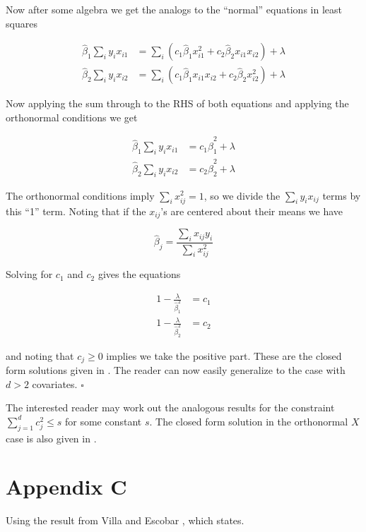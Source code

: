Now after some algebra we get the analogs to the ``normal'' equations in least squares

\begin{align}
  \hat{\beta}_1\sum_iy_ix_{i1}&=\sum_i(c_1\hat{\beta}_1x_{i1}^2+c_2\hat{\beta}_2x_{i1}x_{i2}) +\lambda\\
 \hat{\beta}_2\sum_iy_ix_{i2}&=\sum_i(c_1\hat{\beta}_1x_{i1}x_{i2}+c_2\hat{\beta}_2x^2_{i2})+\lambda 
\end{align}

Now applying the sum through to the RHS of both equations and applying the orthonormal conditions we get

\begin{align}
  \hat{\beta}_1\sum_iy_ix_{i1}&=c_1\hat{\beta}_1^2+\lambda \\
 \hat{\beta}_2\sum_iy_ix_{i2}&=c_2\hat{\beta}_2^2 +\lambda
\end{align}

The orthonormal conditions imply $\sum_ix_{ij}^2=1$, so we divide the $\sum_i y_i x_{ij}$ terms by this ``1'' term. Noting that if the $x_{ij}$'s are centered about their means we have

\begin{equation}
\hat{\beta}_j = \frac{\sum_i x_{ij} y_i}{\sum_ix_{ij}^2} 
\end{equation}

Solving for $c_1$ and $c_2$ gives the equations 

\begin{align}
 1- \frac{\lambda}{\hat{\beta}_1^2}&=c_1 \\
  1-\frac{\lambda}{\hat{\beta}_2^2}&=c_2 
\end{align}

and noting that $c_j \geq 0$ implies we take the positive part.  These are the closed form solutions given in \cite{breiman1995better}. The reader can now easily generalize to the case with $d>2$ covariates. $\square$

The interested reader may work out the analogous results for the constraint $\sum_{j=1}^dc_j^2 \leq s$ for some constant $s$. The closed form solution in the orthonormal $X$ case is also given in \cite{breiman1995better}.  

\section*{Appendix C}

Using the result from Villa and Escobar \cite{villa2006using},  which states. 

